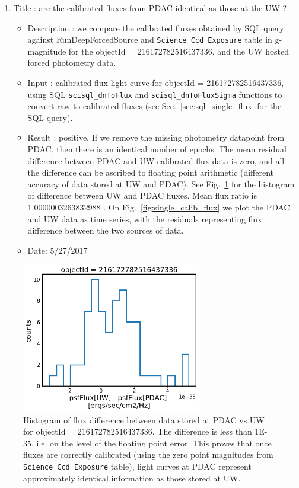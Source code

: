 \documentclass[DM,lsstdraft,toc]{lsstdoc}
\begin{document}
\begin{enumerate}
      \item Title : are the calibrated fluxes from PDAC identical as those at the UW ?
    \begin{itemize}
      \item Description : we compare the calibrated fluxes obtained by SQL query against RunDeepForcedSource and \verb|Science_Ccd_Exposure| table in g-magnitude for the objectId = 216172782516437336, and the UW hosted forced photometry data.
      \item Input : calibrated flux light curve for objectId = 216172782516437336, using SQL \verb|scisql_dnToFlux| and \verb|scisql_dnToFluxSigma| functions to convert raw to calibrated fluxes (see Sec.~\ref{sec:sql_single_flux} for the SQL query).
      \item Result :  positive. If we remove the missing photometry datapoint from PDAC, then there is an identical number of epochs. The mean residual difference between PDAC and UW calibrated flux data is zero, and all the difference can be ascribed to floating point arithmetic (different accuracy of data stored at UW and PDAC). See Fig.~\ref{fig:single_flux_difference} for the histogram of difference between UW and PDAC fluxes. Mean flux ratio is 1.0000003263832988 . On Fig.~\ref{fig:single_calib_flux} we plot the PDAC and UW data as time series, with the residuals representing flux difference between the two sources of data.
      \item Date: 5/27/2017
    \end{itemize}

\end{enumerate}



\begin{figure}
\begin{centering}
\includegraphics[width=0.7\textwidth]{figs/Single_UW_vs_PDAC_flux}
\cprotect\caption{Histogram of flux difference between data stored at PDAC vs UW for objectId = 216172782516437336. The difference is less than 1E-35,  i.e. on the level of the floating point error.  This proves that once fluxes are correctly calibrated (using the zero point magnitudes from \verb|Science_Ccd_Exposure| table), light curves at PDAC represent approximately identical information as those stored at UW.}
\label{fig:single_flux_difference}
\end{centering}
\end{figure}
\end{document}

